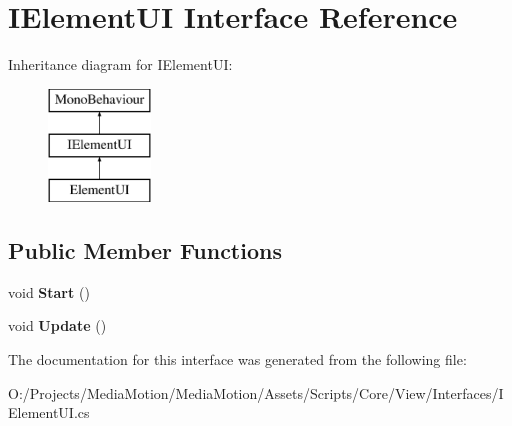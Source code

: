 \hypertarget{interface_i_element_u_i}{\section{I\+Element\+U\+I Interface Reference}
\label{interface_i_element_u_i}
}
Inheritance diagram for I\+Element\+U\+I\+:\begin{figure}[H]
\begin{center}
\leavevmode
\includegraphics[height=3.000000cm]{interface_i_element_u_i}
\end{center}
\end{figure}
\subsection*{Public Member Functions}
\begin{DoxyCompactItemize}
\item 
\hypertarget{interface_i_element_u_i_a87dece230542967739a62fc5373c2ecd}{void {\bfseries Start} ()}\label{interface_i_element_u_i_a87dece230542967739a62fc5373c2ecd}

\item 
\hypertarget{interface_i_element_u_i_acdbcb4730cdbb571992372f586fd6fed}{void {\bfseries Update} ()}\label{interface_i_element_u_i_acdbcb4730cdbb571992372f586fd6fed}

\end{DoxyCompactItemize}


The documentation for this interface was generated from the following file\+:\begin{DoxyCompactItemize}
\item 
O\+:/\+Projects/\+Media\+Motion/\+Media\+Motion/\+Assets/\+Scripts/\+Core/\+View/\+Interfaces/I\+Element\+U\+I.\+cs\end{DoxyCompactItemize}

